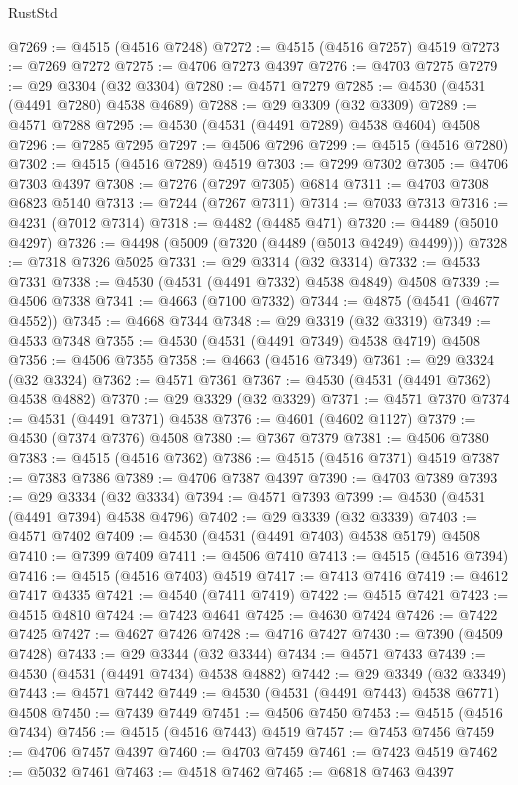 \begin{lexlean}{RustStd}
\begin{coremodule}
{\begin{coremodule}
{{{{{{{{{{{{{{{{{{{{{{{{{{{{{{{{{{{{{{{{{{{{{{{{{{{{{{{@7269 := @4515 (@4516 @7248)
@7272 := @4515 (@4516 @7257) @4519
@7273 := @7269 @7272
@7275 := @4706 @7273 @4397
@7276 := @4703 @7275
@7279 := @29 @3304 (@32 @3304)
@7280 := @4571 @7279
@7285 := @4530 (@4531 (@4491 @7280) @4538 @4689)
@7288 := @29 @3309 (@32 @3309)
@7289 := @4571 @7288
@7295 := @4530 (@4531 (@4491 @7289) @4538 @4604) @4508
@7296 := @7285 @7295
@7297 := @4506 @7296
@7299 := @4515 (@4516 @7280)
@7302 := @4515 (@4516 @7289) @4519
@7303 := @7299 @7302
@7305 := @4706 @7303 @4397
@7308 := @7276 (@7297 @7305) @6814
@7311 := @4703 @7308 @6823 @5140
@7313 := @7244 (@7267 @7311)
@7314 := @7033 @7313
@7316 := @4231 (@7012 @7314)
@7318 := @4482 (@4485 @471)
@7320 := @4489 (@5010 @4297)
@7326 := @4498 (@5009 (@7320 (@4489 (@5013 @4249) @4499)))
@7328 := @7318 @7326 @5025
@7331 := @29 @3314 (@32 @3314)
@7332 := @4533 @7331
@7338 := @4530 (@4531 (@4491 @7332) @4538 @4849) @4508
@7339 := @4506 @7338
@7341 := @4663 (@7100 @7332)
@7344 := @4875 (@4541 (@4677 @4552))
@7345 := @4668 @7344
@7348 := @29 @3319 (@32 @3319)
@7349 := @4533 @7348
@7355 := @4530 (@4531 (@4491 @7349) @4538 @4719) @4508
@7356 := @4506 @7355
@7358 := @4663 (@4516 @7349)
@7361 := @29 @3324 (@32 @3324)
@7362 := @4571 @7361
@7367 := @4530 (@4531 (@4491 @7362) @4538 @4882)
@7370 := @29 @3329 (@32 @3329)
@7371 := @4571 @7370
@7374 := @4531 (@4491 @7371) @4538
@7376 := @4601 (@4602 @1127)
@7379 := @4530 (@7374 @7376) @4508
@7380 := @7367 @7379
@7381 := @4506 @7380
@7383 := @4515 (@4516 @7362)
@7386 := @4515 (@4516 @7371) @4519
@7387 := @7383 @7386
@7389 := @4706 @7387 @4397
@7390 := @4703 @7389
@7393 := @29 @3334 (@32 @3334)
@7394 := @4571 @7393
@7399 := @4530 (@4531 (@4491 @7394) @4538 @4796)
@7402 := @29 @3339 (@32 @3339)
@7403 := @4571 @7402
@7409 := @4530 (@4531 (@4491 @7403) @4538 @5179) @4508
@7410 := @7399 @7409
@7411 := @4506 @7410
@7413 := @4515 (@4516 @7394)
@7416 := @4515 (@4516 @7403) @4519
@7417 := @7413 @7416
@7419 := @4612 @7417 @4335
@7421 := @4540 (@7411 @7419)
@7422 := @4515 @7421
@7423 := @4515 @4810
@7424 := @7423 @4641
@7425 := @4630 @7424
@7426 := @7422 @7425
@7427 := @4627 @7426
@7428 := @4716 @7427
@7430 := @7390 (@4509 @7428)
@7433 := @29 @3344 (@32 @3344)
@7434 := @4571 @7433
@7439 := @4530 (@4531 (@4491 @7434) @4538 @4882)
@7442 := @29 @3349 (@32 @3349)
@7443 := @4571 @7442
@7449 := @4530 (@4531 (@4491 @7443) @4538 @6771) @4508
@7450 := @7439 @7449
@7451 := @4506 @7450
@7453 := @4515 (@4516 @7434)
@7456 := @4515 (@4516 @7443) @4519
@7457 := @7453 @7456
@7459 := @4706 @7457 @4397
@7460 := @4703 @7459
@7461 := @7423 @4519
@7462 := @5032 @7461
@7463 := @4518 @7462
@7465 := @6818 @7463 @4397
}}}}}}}}}}}}}}}}}}}}}}}}}}}}}}}}}}}}}}}}}}}}}}}}}}}}}}}
\end{coremodule}}
\end{coremodule}
\end{lexlean}

